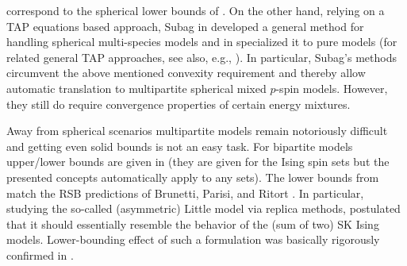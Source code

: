\documentclass[10pt]{article}
\begin{document}
correspond to the spherical lower bounds of \cite{BatesSohn25}.  On the other hand, relying on a TAP equations based approach, Subag in \cite{Subagtap23a} developed a general method for handling spherical multi-species models and in \cite{Subagtap23b} specialized it to pure models (for related general TAP approaches, see also, e.g., \cite{Chenetal23,Chenetal21}). In particular, Subag's methods circumvent the above mentioned convexity requirement and thereby allow automatic translation to multipartite spherical mixed $p$-spin models. However, they still do require convergence properties of certain energy mixtures.





 Away from spherical scenarios multipartite models remain notoriously difficult and getting even solid bounds is not an easy task. For bipartite models upper/lower bounds are given in \cite{StojnicAsymmLittBnds11} (they are given for the Ising spin sets but the presented concepts automatically apply to any sets). The lower bounds from  \cite{StojnicAsymmLittBnds11} match the RSB predictions of Brunetti, Parisi, and Ritort \cite{BruParRit92}. In particular, studying the so-called (asymmetric) Little model via replica methods, \cite{BruParRit92} postulated that it should essentially resemble the behavior of the (sum of two) SK Ising models. Lower-bounding effect of such a formulation was basically rigorously confirmed in \cite{StojnicAsymmLittBnds11}.
\end{document}
